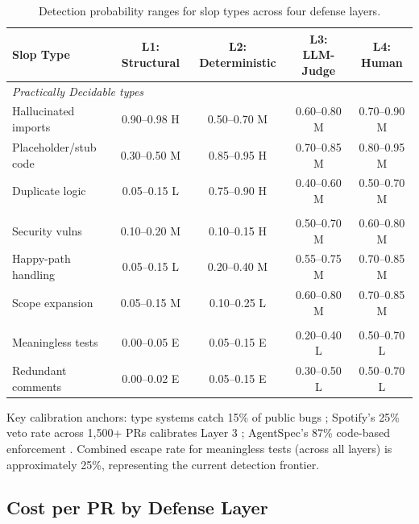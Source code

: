 \documentclass[11pt, a4paper, logo, copyright]{googledeepmind}
\begin{document}
\begin{table}[htbp]
\centering
\caption{Detection probability ranges for slop types across four defense layers.}
\label{tab:detection}
\small
\begin{tabular}{@{}l c c c c@{}}
\toprule
\textbf{Slop Type} & \textbf{L1: Structural} & \textbf{L2: Deterministic} & \textbf{L3: LLM-Judge} & \textbf{L4: Human} \\
\midrule
\multicolumn{5}{l}{\textit{Practically Decidable types}} \\
\addlinespace
Hallucinated imports & 0.90--0.98 H & 0.50--0.70 M & 0.60--0.80 M & 0.70--0.90 M \\
Placeholder/stub code & 0.30--0.50 M & 0.85--0.95 H & 0.70--0.85 M & 0.80--0.95 M \\
Duplicate logic & 0.05--0.15 L & 0.75--0.90 H & 0.40--0.60 M & 0.50--0.70 M \\
\addlinespace
\multicolumn{5}{l}{\textit{Partially Detectable types}} \\
\addlinespace
Security vulns & 0.10--0.20 M & 0.10--0.15 H & 0.50--0.70 M & 0.60--0.80 M \\
Happy-path handling & 0.05--0.15 L & 0.20--0.40 M & 0.55--0.75 M & 0.70--0.85 M \\
Scope expansion & 0.05--0.15 M & 0.10--0.25 L & 0.60--0.80 M & 0.70--0.85 M \\
\addlinespace
\multicolumn{5}{l}{\textit{Reliably Undetectable types}} \\
\addlinespace
Meaningless tests & 0.00--0.05 E & 0.05--0.15 E & 0.20--0.40 L & 0.50--0.70 L \\
Redundant comments & 0.00--0.02 E & 0.05--0.15 E & 0.30--0.50 L & 0.50--0.70 L \\
\bottomrule
\end{tabular}
\end{table}

Key calibration anchors: type systems catch 15\% of public bugs \citep{gao2017}; Spotify's 25\% veto rate across 1,500+ PRs calibrates Layer 3 \citep{spotify2025}; AgentSpec's 87\% code-based enforcement \citep{wang2026agentspec}. Combined escape rate for meaningless tests (across all layers) is approximately 25\%, representing the current detection frontier.

\subsection{Cost per PR by Defense Layer}
\end{document}
